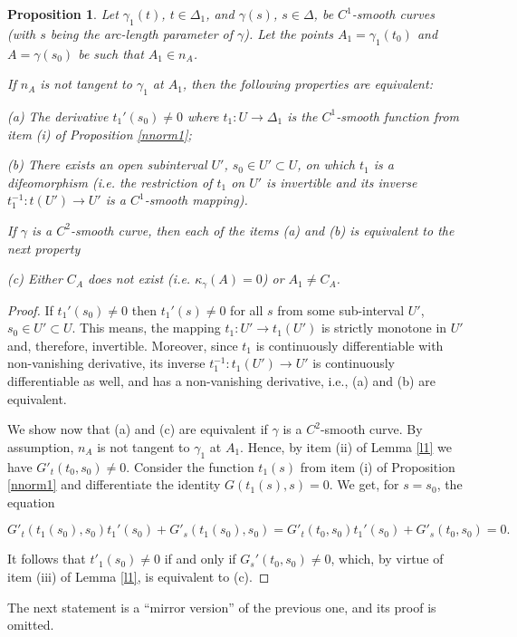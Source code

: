 \documentclass[10pt,a4paper]{amsart}
\newtheorem{prop}[thm]{Proposition}
\def\g{\gamma}
\begin{document}
\begin{prop}\label{nnorm2}
 Let $\g_1(t)$, $t \in \Delta_1$, and $\g(s)$,
 $s \in \Delta$, be  $C^1$-smooth curves (with  $s$ being the arc-length parameter of
 $\g$). Let the points $A_1= \g_1(t_0)$ and $A= \g(s_0)$ be such that $A_1 \in n_A$.

If $n_A$ is not tangent to $\g_1$  at $A_1$, then  the following properties are equivalent:

(a) The derivative $t_1'(s_0) \neq 0$ where
$t_1: U \rightarrow \Delta_1$ is the $C^1$-smooth function from item (i) of Proposition
\ref{nnorm1};

(b) There exists an open subinterval $U'$, $s_0 \in U'\subset U$, on which $t_1$ is a difeomorphism (i.e. the restriction of $t_1$ on $U'$ is invertible and its inverse $t_1^{-1}: t(U') \rightarrow U' $  is a  $C^1$-smooth mapping).

If $\g$ is a $C^2$-smooth curve, then each of the items (a) and (b) is equivalent to the next property

(c)  Either $C_A$ does not exist (i.e.
$\kappa_{\g}(A)=0$) or $A_1\neq C_A$.

\end{prop}
\begin{proof} If $t_1'(s_0) \neq 0$  then $t_1'(s) \neq 0$ for all $s$ from some sub-interval $U'$, $s_0 \in U'\subset U$. This means, the mapping $t_1:U' \to t_1(U')$ is strictly monotone in $U'$ and, therefore, invertible. Moreover, since $t_1$ is continuously differentiable with non-vanishing derivative, its inverse
$t_1^{-1}:t_1(U') \rightarrow U'$ is continuously differentiable as well, and has a non-vanishing derivative, i.e., (a) and (b) are equivalent.

We show now that (a) and (c) are equivalent if $\g$ is a $C^2$-smooth curve.
By assumption,
$n_A$ is not tangent to $\g_1$ at $A_1$. Hence, by item (ii) of Lemma \ref{l1} we have $G'_t(t_0,s_0) \neq 0$. Consider the function $t_1(s)$ from item (i) of Proposition \ref{nnorm1} and differentiate the identity  $G(t_1(s), s) =0$. We get, for $s=s_0$, the equation

\begin{equation}\label{9}
G'_t(t_1(s_0),s_0)t_1'(s_0) + G'_s(t_1(s_0),s_0)=G'_t(t_0,s_0)t_1'(s_0) + G'_s(t_0,s_0) = 0.
\end{equation}

It follows that $t'_1(s_0) \neq 0$ if and only if $G_s'(t_0,s_0) \neq 0$, which, by virtue of item (iii) of Lemma \ref{l1}, is equivalent to  (c).
\end{proof}
The next statement is a ``mirror version'' of the previous one, and its proof is omitted.
\end{document}
